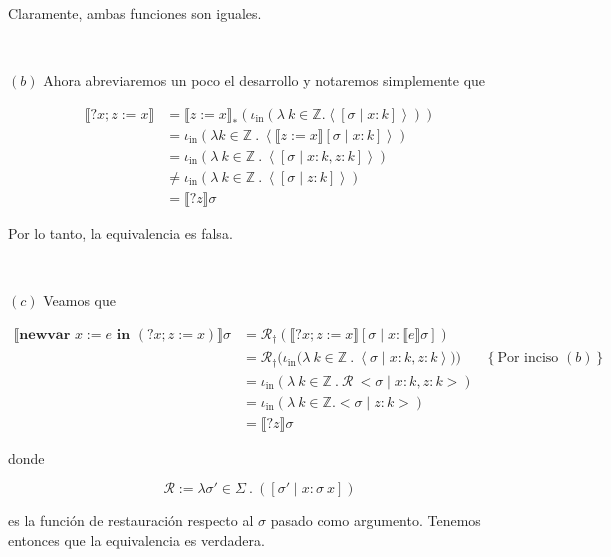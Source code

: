 \documentclass[a4paper, 12pt]{article}
\begin{document}
Claramente, ambas funciones son iguales.

~ 


$(b)$ Ahora abreviaremos un poco el desarrollo y notaremos simplemente que

\begin{align*}
  \llbracket ?x; z := x \rrbracket 
  &= \llbracket z := x \rrbracket_*\left( \iota_{\text{in}} \left( \lambda ~ k
  \in \mathbb{Z} . \left< [\sigma \mid x : k] \right> \right)  \right) \\ 
  &=\iota_{\text{in}} \left( \lambda k \in \mathbb{Z} ~.~ \left< \llbracket z :=
  x\rrbracket[\sigma \mid x : k] \right> \right)  \\ 
  &=\iota_{\text{in}} \left( \lambda ~k \in \mathbb{Z} ~.~ \left< [\sigma \mid x
  :k, z : k] \right> \right)  \\
  &\neq \iota_{\text{in}} \left( \lambda ~ k \in \mathbb{Z} ~.~ \left<[\sigma
  \mid z : k] \right> \right)  \\ 
  &= \llbracket ?z \rrbracket\sigma
\end{align*}


Por lo tanto, la equivalencia es falsa.

~

$(c)$ Veamos que 

\begin{align*}
  \llbracket \textbf{newvar } x := e \textbf{ in } (?x;z :=x)\rrbracket\sigma 
  &= \mathcal{R}_\dagger \left( \llbracket ?x; z:=x \rrbracket [\sigma \mid x :
  \llbracket e \rrbracket\sigma] \right)  \\ 
  &=\mathcal{R}_\dagger \Bigg( \iota_{\text{in}}\Big( \lambda ~ k \in \mathbb{Z}
~.~ \left< \sigma \mid x : k, z : k \right>\Big) \Bigg) &\left\{ \text{Por
inciso } (b) \right\} \\ 
&=\iota_{\text{in}} \left( \lambda ~ k \in \mathbb{Z} ~.~ \mathcal{R}~\Big<
\sigma \mid x :k, z : k \Big> \right)  \\ 
&=\iota_{\text{in}} \left( \lambda ~ k \in \mathbb{Z} . \big< \sigma \mid z :
k\big> \right)  \\ 
&=\llbracket ?z \rrbracket\sigma
\end{align*}

donde 

\begin{equation*}
  \mathcal{R} := \lambda \sigma' \in \Sigma ~.~ \left( [\sigma' \mid x : \sigma
  ~ x] \right) 
\end{equation*}

es la función de restauración respecto al $\sigma$ pasado como argumento.
Tenemos entonces que la equivalencia es verdadera.
\end{document}
